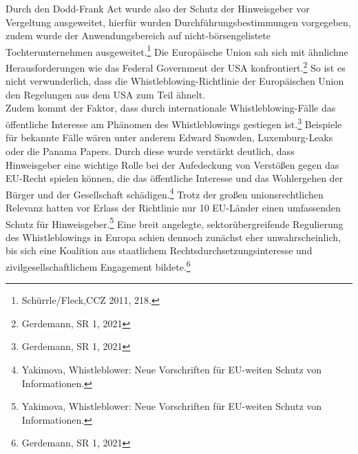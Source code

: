 Durch den Dodd-Frank Act wurde also der Schutz der Hinweisgeber vor Vergeltung ausgeweitet, hierfür wurden Durchführungsbestimmungen vorgegeben, zudem wurde der Anwendungsbereich auf nicht-börsengelistete Tochterunternehmen ausgeweitet.\footnote{Schürrle/Fleck,CCZ 2011, 218.}
Die Europäische Union sah sich mit ähnlichne Herausforderungen wie das Federal Government der USA konfrontiert.\footnote{Gerdemann, SR 1, 2021}
So ist es nicht verwunderlich, dass die Whistleblowing-Richtlinie der Europäischen Union den Regelungen aus dem USA zum Teil ähnelt.\\
Zudem kommt der Faktor, dass durch internationale Whistleblowing-Fälle das öffentliche Interesse am Phänomen des Whistleblowings gestiegen ist.\footnote{Gerdemann, SR 1, 2021} 
Beispiele für bekannte Fälle wären unter anderem Edward Snowden, Luxemburg-Leaks oder die Panama Papers.
Durch diese wurde verstärkt deutlich, dass Hinweisgeber eine wichtige Rolle bei der Aufedeckung von Verstößen gegen das EU-Recht spielen können, die das öffentliche Interesse und das Wohlergehen der Bürger und der Gesellschaft schädigen.\footnote{Yakimova, Whistleblower: Neue Vorschriften für EU-weiten Schutz von Informationen.}
Trotz der großen unionsrechtlichen Relevanz hatten vor Erlass der Richtlinie nur 10 EU-Länder einen umfassenden Schutz für Hinweisgeber.\footnote{Yakimova, Whistleblower: Neue Vorschriften für EU-weiten Schutz von Informationen.}
Eine breit angelegte, sektorübergreifende Regulierung des Whistleblowings in Europa schien dennoch zunächst eher unwahrscheinlich, bis sich eine Koalition aus staatlichem Rechtsdurchsetzungsinteresse und zivilgesellschaftlichem Engagement bildete.\footnote{Gerdemann, SR 1, 2021} 
